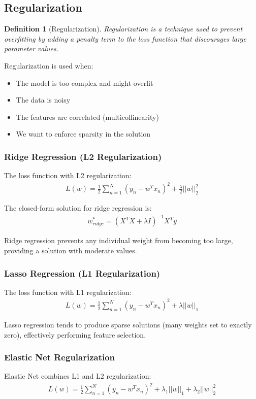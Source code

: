\documentclass{article}
\newtheorem{definition}{Definition}
\begin{document}
\subsection{Regularization}
\begin{definition}[Regularization]
Regularization is a technique used to prevent overfitting by adding a penalty term to the loss function that discourages large parameter values.
\end{definition}

Regularization is used when:
\begin{itemize}
\item The model is too complex and might overfit
\item The data is noisy
\item The features are correlated (multicollinearity)
\item We want to enforce sparsity in the solution
\end{itemize}

\subsubsection{Ridge Regression (L2 Regularization)}
The loss function with L2 regularization:
\begin{align}
L(w) = \frac{1}{2}\sum_{n=1}^{N}(y_n - w^Tx_n)^2 + \frac{\lambda}{2}||w||_2^2
\end{align}

The closed-form solution for ridge regression is:
\begin{align}
w_{ridge}^* = (X^TX + \lambda I)^{-1}X^Ty
\end{align}

Ridge regression prevents any individual weight from becoming too large, providing a solution with moderate values.

\subsubsection{Lasso Regression (L1 Regularization)}
The loss function with L1 regularization:
\begin{align}
L(w) = \frac{1}{2}\sum_{n=1}^{N}(y_n - w^Tx_n)^2 + \lambda||w||_1
\end{align}

Lasso regression tends to produce sparse solutions (many weights set to exactly zero), effectively performing feature selection.

\subsubsection{Elastic Net Regularization}
Elastic Net combines L1 and L2 regularization:
\begin{align}
L(w) = \frac{1}{2}\sum_{n=1}^{N}(y_n - w^Tx_n)^2 + \lambda_1||w||_1 + \lambda_2||w||_2^2
\end{align}
\end{document}
